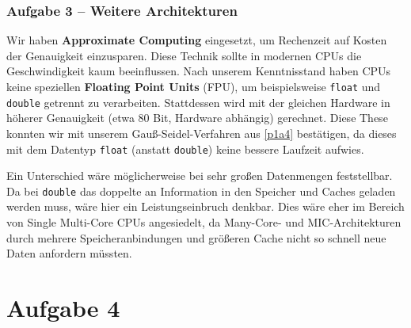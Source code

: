 \documentclass[german,notes,18pt]{beamer}
\begin{document}
	\begin{frame}
		\frametitle{Aufgabe 3 -- Weitere Architekturen}
		Wir haben \textbf{Approximate Computing} eingesetzt, um Rechenzeit auf Kosten der Genauigkeit einzusparen.
		Diese Technik sollte in modernen CPUs die Geschwindigkeit kaum beeinflussen. Nach unserem Kenntnisstand haben CPUs keine speziellen \textbf{Floating Point Units} (FPU), um beispielsweise \texttt{float} und \texttt{double} getrennt zu verarbeiten. Stattdessen wird mit der gleichen Hardware in höherer Genauigkeit (etwa 80 Bit, Hardware abhängig) gerechnet.
		Diese These konnten wir mit unserem Gauß-Seidel-Verfahren aus \ref{p1a4} bestätigen, da dieses mit dem Datentyp \texttt{float} (anstatt \texttt{double}) keine bessere Laufzeit aufwies.
		
		Ein Unterschied wäre möglicherweise bei sehr großen Datenmengen feststellbar. Da bei \texttt{double} das doppelte an Information in den Speicher und Caches geladen werden muss, wäre hier ein Leistungseinbruch denkbar. Dies wäre eher im Bereich von Single Multi-Core CPUs angesiedelt, da Many-Core- und MIC-Architekturen durch mehrere Speicheranbindungen und größeren Cache nicht so schnell neue Daten anfordern müssten.
	\end{frame}

	\section{Aufgabe 4}
\end{document}
